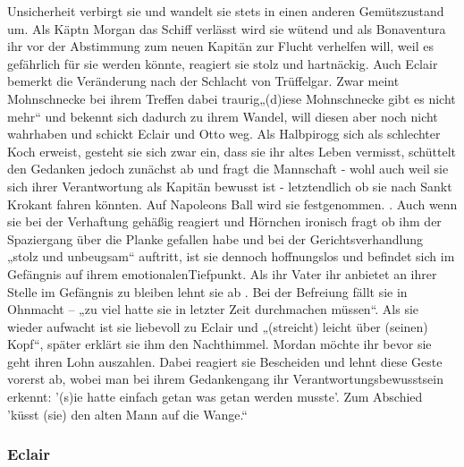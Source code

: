 Unsicherheit verbirgt sie und wandelt sie stets in einen anderen Gemütszustand um. Als Käptn Morgan das Schiff 
verlässt wird sie wütend \cite[S.375]{pir} und als Bonaventura ihr vor der Abstimmung zum neuen Kapitän zur Flucht verhelfen 
will, weil es gefährlich für sie werden könnte, reagiert sie stolz und hartnäckig.\cite[S.378f]{pir} Auch Eclair bemerkt 
die Veränderung nach der Schlacht von Trüffelgar.\cite[S.461]{pir} Zwar meint 
Mohnschnecke bei ihrem Treffen dabei traurig„(d)iese Mohnschnecke gibt es nicht mehr“\cite[S.463]{pir} und bekennt sich dadurch zu ihrem Wandel, 
will diesen aber noch nicht wahrhaben und schickt Eclair und Otto weg.\cite[S.463f]{pir} Als Halbpirogg sich als schlechter 
Koch erweist,\cite[S.218ff]{pir} gesteht sie sich zwar ein, dass sie ihr altes Leben vermisst, schüttelt den Gedanken jedoch
zunächst ab \cite[S.521f]{pir} und fragt die Mannschaft - wohl auch weil sie sich ihrer Verantwortung als Kapitän bewusst ist - letztendlich ob sie nach Sankt Krokant fahren könnten.\cite[S.529]{pir} Auf Napoleons Ball wird sie festgenommen. \cite[S.551]{pir}.
Auch wenn sie bei der Verhaftung gehäßig reagiert und Hörnchen ironisch fragt ob ihm der Spaziergang über die Planke gefallen habe \cite[S.522]{pir} und bei der Gerichtsverhandlung „stolz und 
unbeugsam“ \cite[S.573]{pir} auftritt, ist sie dennoch hoffnungslos und befindet sich im Gefängnis auf ihrem emotionalenTiefpunkt.\cite[S.561]{pir} Als ihr Vater ihr anbietet an ihrer Stelle im Gefängnis zu bleiben lehnt sie ab \cite[S.562]{pir}. Bei der Befreiung fällt sie in Ohnmacht – „zu viel hatte sie in letzter Zeit durchmachen müssen“\cite[S.617]{pir}. Als sie wieder aufwacht ist sie liebevoll zu Eclair und „(streicht) leicht über (seinen) Kopf“, später erklärt sie ihm den Nachthimmel.\cite[S.631]{pir} Mordan möchte ihr bevor sie geht ihren Lohn auszahlen. Dabei reagiert sie Bescheiden und lehnt diese Geste vorerst ab, wobei man bei ihrem Gedankengang ihr Verantwortungsbewusstsein erkennt: \cite[S.638]{pir} '(s)ie hatte einfach getan was getan werden musste'.\cite[S.638]{pir} Zum Abschied 'küsst (sie) den alten Mann auf die Wange.“\cite[S.638]{pir}

\subsubsection{Eclair}

